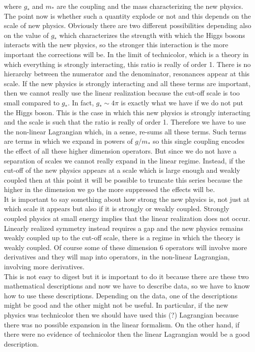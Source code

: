 \documentclass[../main.tex]{subfiles}
\begin{document}
where $g_*$ and $m_*$ are the coupling and the mass characterizing the new physics. The point now is whether such a quantity explode or not and this depends on the scale of new physics. Obviously there are two different possibilities depending also on the value of $g_*$ which characterizes the strength with which the Higgs bosons interacts with the new physics, so the stronger this interaction is the more important the corrections will be. In the limit of technicolor, which is a theory in which everything is strongly interacting, this ratio is really of order 1. There is no hierarchy between the numerator and the denominator, resonances appear at this scale. If the new physics is strongly interacting and all these terms are important, then we cannot really use the linear realization because the cut-off scale is too small compared to $g_*$. In fact, $g_*\sim4\pi$ is exactly what we have if we do not put the Higgs boson. This is the case in which this new physics is strongly interacting and the scale is such that the ratio is really of order 1. Therefore we have to use the non-linear Lagrangian which, in a sense, re-sums all these terms. Such terms are terms in which we expand in powers of $g/m_*$ so this single coupling encodes the effect of all these higher dimension operators. But since we do not have a separation of scales we cannot really expand in the linear regime. Instead, if the cut-off of the new physics appears at a scale which is large enough and weakly coupled then at this point it will be possible to truncate this series because the higher in the dimension we go the more suppressed the effects will be.\\
It is important to say something about how strong the new physics is, not just at which scale it appears but also if it is strongly or weakly coupled. Strongly coupled physics at small energy implies that the linear realization does not occur. Linearly realized symmetry instead requires a gap and the new physics remains weakly coupled up to the cut-off scale, there is a regime in which the theory is weakly coupled. Of course some of these dimension 6 operators will involve more derivatives and they will map into operators, in the non-linear Lagrangian, involving more derivatives.\\
This is not easy to digest but it is important to do it because there are these two mathematical descriptions and now we have to describe data, so we have to know how to use these descriptions. Depending on the data, one of the descriptions might be good and the other might not be useful. In particular, if the new physics was technicolor then we should have used this (?) Lagrangian because there was no possible expansion in the linear formalism. On the other hand, if there were no evidence of technicolor then the linear Lagrangian would be a good description.\\
\end{document}
